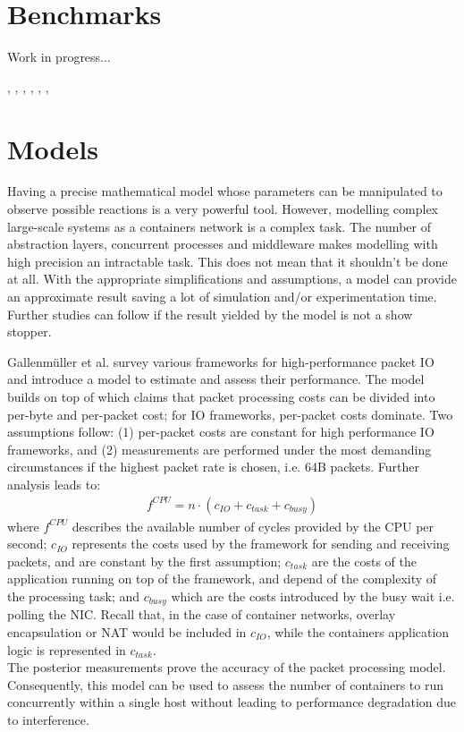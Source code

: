 \documentclass[conference]{IEEEtran}
\begin{document}
\section{Benchmarks}
Work in progress...

\cite{IEEE_INFOCOM_2018:K. Suo}, \cite{HotConNet_17:Zhao}, \cite{Nakamura:2018}, \cite{Zhao:2017}, \cite{Boeira:2021}, \cite{Bankston:2018}, \cite{CoNEXT:2018}

\section{Models}
Having a precise mathematical model whose parameters can be manipulated to observe possible reactions is a very powerful tool. However, modelling complex large-scale systems as a containers network is a complex task. The number of abstraction layers, concurrent processes and middleware makes modelling with high precision an intractable task. This does not mean that it shouldn't be done at all. With the appropriate simplifications and assumptions, a model can provide an approximate result saving a lot of simulation and/or experimentation time. Further studies can follow if the result yielded by the model is not a show stopper.

Gallenmüller et al. \cite{ANCS:Gallenmüller} survey various frameworks for high-performance packet IO and introduce a model to estimate and assess their performance. The model builds on top of \cite{Rizzo:2012} which claims that packet processing costs can be divided into per-byte and per-packet cost; for IO frameworks, per-packet costs dominate. Two assumptions follow: (1) per-packet costs are constant for high performance IO frameworks, and (2) measurements are performed under the most demanding circumstances if the highest packet rate is chosen, i.e. 64B packets. Further analysis leads to:
\begin{align}
f^{CPU} = n \cdot (c_{IO}+c_{task}+c_{busy})
\end{align}
\noindent where $f^{CPU}$ describes the available number of cycles provided by the CPU per second; $c_{IO}$ represents the costs used by the framework for sending and receiving packets, and are constant by the first assumption; $c_{task}$ are the costs of the application running on top of the framework, and depend of the complexity of the processing task; and $c_{busy}$ which are the costs introduced by the busy wait i.e. polling the NIC. Recall that, in the case of container networks, overlay encapsulation or NAT would be included in 
$c_{IO}$, while the containers application logic is represented in $c_{task}$.\\
The posterior measurements prove the accuracy of the packet processing model. Consequently, this model can be used to assess the number of containers to run concurrently within a single host without leading to performance degradation due to interference.
\end{document}
